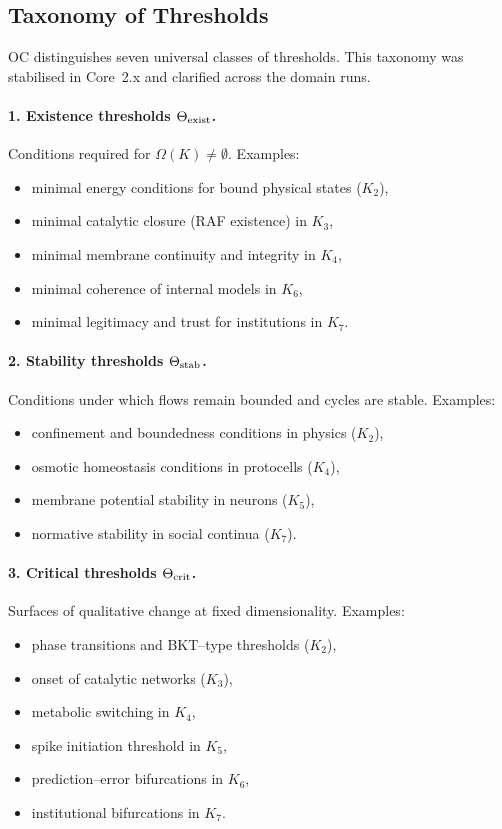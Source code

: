 \subsection{Taxonomy of Thresholds}

OC distinguishes seven universal classes of thresholds. This taxonomy was
stabilised in Core~2.x and clarified across the domain runs.

\paragraph{1. Existence thresholds \(\Theta_{\rm exist}\).}
Conditions required for \(\Omega(K)\neq\emptyset\).
Examples:
\begin{itemize}
    \item minimal energy conditions for bound physical states (\(K_2\)),
    \item minimal catalytic closure (RAF existence) in \(K_3\),
    \item minimal membrane continuity and integrity in \(K_4\),
    \item minimal coherence of internal models in \(K_6\),
    \item minimal legitimacy and trust for institutions in \(K_7\).
\end{itemize}

\paragraph{2. Stability thresholds \(\Theta_{\rm stab}\).}
Conditions under which flows remain bounded and cycles are stable.
Examples:
\begin{itemize}
    \item confinement and boundedness conditions in physics (\(K_2\)),
    \item osmotic homeostasis conditions in protocells (\(K_4\)),
    \item membrane potential stability in neurons (\(K_5\)),
    \item normative stability in social continua (\(K_7\)).
\end{itemize}

\paragraph{3. Critical thresholds \(\Theta_{\rm crit}\).}
Surfaces of qualitative change at fixed dimensionality.
Examples:
\begin{itemize}
    \item phase transitions and BKT–type thresholds (\(K_2\)),
    \item onset of catalytic networks (\(K_3\)),
    \item metabolic switching in \(K_4\),
    \item spike initiation threshold in \(K_5\),
    \item prediction–error bifurcations in \(K_6\),
    \item institutional bifurcations in \(K_7\).
\end{itemize}

